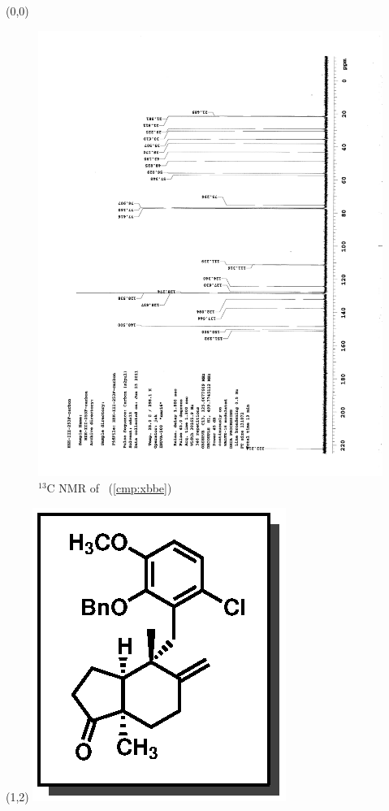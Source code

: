 \clearpage
\begin{textblock}{20}(0,0)
\begin{figure}[htb]
\caption{$^{13}$C NMR of  \CMPxbbe\ (\ref{cmp:xbbe})}
\includegraphics[scale=0.75, trim = 0mm 0mm 0mm 5mm,
clip]{chp_singlecarbon/images/nmr/xbbeC}
\vspace{-100pt}
\end{figure}
\end{textblock}
\begin{textblock}{1}(1,2)
\includegraphics[scale=0.8, angle=90]{chp_singlecarbon/images/xbbe}
\end{textblock}
\clearpage

